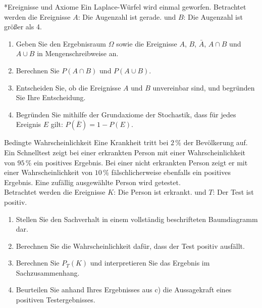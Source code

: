 

\begin{uebung}*{Ereignisse und Axiome}
Ein Laplace-Würfel wird einmal geworfen. Betrachtet werden die Ereignisse $A$: \glqq Die Augenzahl ist gerade.\grqq{} und $B$: \glqq Die Augenzahl ist größer als 4.\grqq
\begin{enumerate}[label=\alph*)]
  \item Geben Sie den Ergebnisraum $\Omega$ sowie die Ereignisse $A$, $B$, $\bar{A}$, $A\cap B$ und $A\cup B$ in Mengenschreibweise an.
  \item Berechnen Sie $P(A\cap B)$ und $P(A\cup B)$.
  \item Entscheiden Sie, ob die Ereignisse $A$ und $B$ unvereinbar sind, und begründen Sie Ihre Entscheidung.
  \item Begründen Sie mithilfe der Grundaxiome der Stochastik, dass für jedes Ereignis $E$ gilt: $P(\bar{E}) = 1-P(E)$.
\end{enumerate}
\end{uebung}

\begin{uebung}{Bedingte Wahrscheinlichkeit}
Eine Krankheit tritt bei $2\,\%$ der Bevölkerung auf. Ein Schnelltest zeigt bei einer erkrankten Person mit einer Wahrscheinlichkeit von $95\,\%$ ein positives Ergebnis. Bei einer nicht erkrankten Person zeigt er mit einer Wahrscheinlichkeit von $10\,\%$ fälschlicherweise ebenfalls ein positives Ergebnis. Eine zufällig ausgewählte Person wird getestet.\\
Betrachtet werden die Ereignisse $K$: \glqq Die Person ist erkrankt.\grqq{} und $T$: \glqq Der Test ist positiv.\grqq
\begin{enumerate}[label=\alph*)]
  \item Stellen Sie den Sachverhalt in einem vollständig beschrifteten Baumdiagramm dar.
  \item Berechnen Sie die Wahrscheinlichkeit dafür, dass der Test positiv ausfällt.
  \item Berechnen Sie $P_T(K)$ und interpretieren Sie das Ergebnis im Sachzusammenhang.
  \item Beurteilen Sie anhand Ihres Ergebnisses aus c) die Aussagekraft eines positiven Testergebnisses.
\end{enumerate}
\end{uebung}

